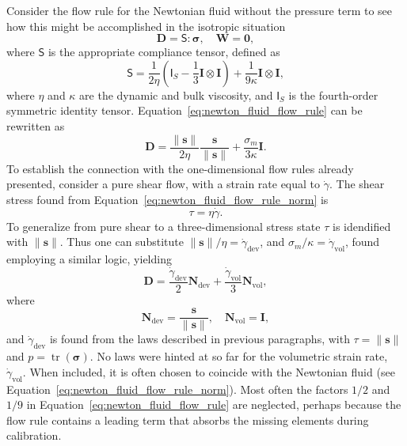 Consider the flow rule for the Newtonian fluid without the pressure term to see how this might be accomplished in the isotropic situation
\begin{equation}
	\label{eq:newton_fluid_flow_rule}
	\mathbf D = \bm{\mathsf S}: \bm \sigma,\quad \mathbf W = \bm 0,
\end{equation}
where $\bm{\mathsf S}$ is the appropriate compliance tensor, defined as
\begin{equation}
	\bm{\mathsf S} = \frac{1}{2\eta} \left(\bm{\mathsf I}_S - \frac{1}{3} \mathbf I\otimes\mathbf I\right) + \frac{1}{9\kappa} \mathbf I\otimes \mathbf I,
\end{equation}
where $\eta$ and $\kappa$ are the dynamic and bulk viscosity, and $\bm{\mathsf I}_S$ is the fourth-order symmetric identity tensor.
Equation~\eqref{eq:newton_fluid_flow_rule} can be rewritten as
\begin{equation}
	\label{eq:newton_fluid_flow_rule_norm}
	\mathbf D = \frac{\|\mathbf s\|}{2 \eta} \frac{\mathbf s}{\|\mathbf s\|} + \frac{\sigma_m}{3\kappa} \mathbf I.
\end{equation}
To establish the connection with the one-dimensional flow rules already presented, consider a pure shear flow, with a strain rate equal to $\dot \gamma$.
The shear stress found from Equation~\eqref{eq:newton_fluid_flow_rule_norm} is
\begin{equation}
	\tau = \eta \dot\gamma.
\end{equation}
To generalize from pure shear to a three-dimensional stress state $\tau$ is idendified with $\|\mathbf s\|$.
Thus one can substitute $\|\mathbf s\|/\eta = \dot\gamma_\text{dev}$, and $\sigma_m /\kappa = \dot\gamma_\text{vol}$, found employing a similar logic, yielding
\begin{equation}
	\mathbf D = \frac{\dot \gamma_\text{dev} }{2} \mathbf N_\text{dev} + \frac{\dot\gamma_\text{vol} }{3} \mathbf N_\text{vol},
\end{equation}
where
\begin{equation}
	\label{eq:flow_rule_directions}
	\mathbf N_\text{dev} = \frac{\mathbf s}{\|\mathbf s\|},\quad \mathbf N_\text{vol} = \mathbf I,
\end{equation}
and $\dot \gamma_\text{dev}$ is found from the laws described in previous paragraphs, with $\tau=\|\mathbf s\|$ and $p = \operatorname{tr}(\bm \sigma)$.
No laws were hinted at so far for the volumetric strain rate, $\dot \gamma_\text{vol}$.
When included, it is often chosen to coincide with the Newtonian fluid (see Equation~\eqref{eq:newton_fluid_flow_rule_norm}).
Most often the factors $1/2$ and $1/9$ in Equation~\eqref{eq:newton_fluid_flow_rule} are neglected, perhaps because the flow rule contains a leading term that absorbs the missing elements during calibration.

